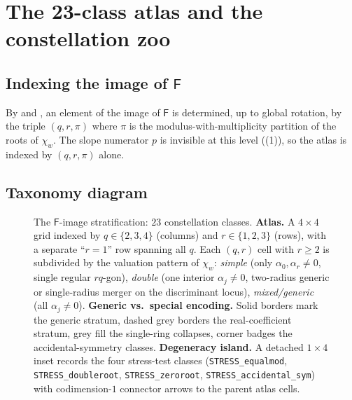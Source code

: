 \documentclass[11pt,a4paper]{article}
\theoremstyle{plain}
\theoremstyle{definition}
\theoremstyle{remark}
\newcommand{\Fclass}{\mathsf{F}}
\begin{document}
\section{The 23-class atlas and the constellation zoo}\label{sec:classes}

\subsection{\texorpdfstring{Indexing the image of $\Fclass$}{Indexing the image of F}}\label{ssec:classes-index}

By  and , an element of the image of
$\Fclass$ is determined, up to global rotation, by the triple $(q, r,
\pi)$ where $\pi$ is the modulus-with-multiplicity partition of the roots
of $\chi_w$. The slope numerator $p$ is invisible at this level
((1)), so the atlas is indexed by $(q, r, \pi)$ alone.

\subsection{Taxonomy diagram}\label{ssec:taxonomy}

\begin{figure}[t]
\centering
{}
\caption{The $\Fclass$-image stratification: $23$ constellation classes.
\textbf{Atlas.} A $4 \times 4$ grid indexed by $q \in \{2, 3, 4\}$
(columns) and $r \in \{1, 2, 3\}$ (rows), with a separate ``$r = 1$''
row spanning all $q$. Each $(q, r)$ cell with $r \ge 2$ is subdivided by
the valuation pattern of $\chi_w$: \emph{simple} (only $\alpha_0,
\alpha_r \ne 0$, single regular $rq$-gon), \emph{double} (one interior
$\alpha_j \ne 0$, two-radius generic or single-radius merger on the
discriminant locus), \emph{mixed/generic} (all $\alpha_j \ne 0$).
\textbf{Generic vs.\ special encoding.} Solid borders mark the generic
stratum, dashed grey borders the real-coefficient stratum, grey fill the
single-ring collapses, corner badges the accidental-symmetry classes.
\textbf{Degeneracy island.} A detached $1 \times 4$ inset records the
four stress-test classes (\texttt{STRESS\_equalmod},
\texttt{STRESS\_doubleroot}, \texttt{STRESS\_zeroroot},
\texttt{STRESS\_accidental\_sym}) with codimension-$1$ connector arrows
to the parent atlas cells.}
\label{fig:taxonomy}
\end{figure}
\end{document}
